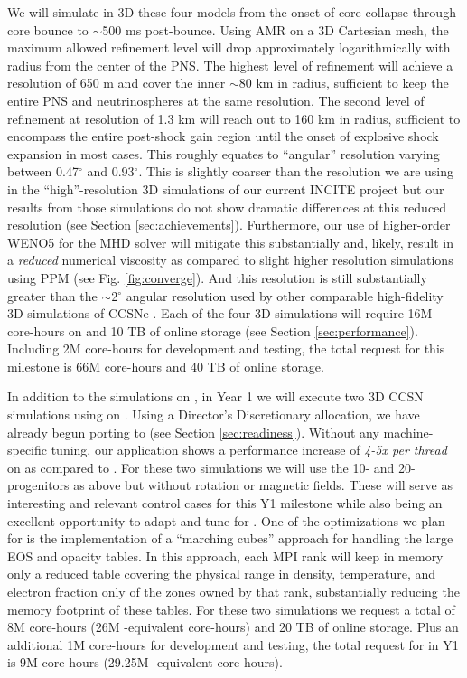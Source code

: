 We will simulate in 3D these four models from the onset of core collapse through core bounce to $\sim$500 ms post-bounce.
Using AMR on a 3D Cartesian mesh, the maximum allowed refinement level will drop approximately logarithmically with radius from the center of the PNS.
The highest level of refinement will achieve a resolution of 650 m and cover the inner $\sim$80 km in radius, sufficient to keep the entire PNS and neutrinospheres at the same resolution.
The second level of refinement at resolution of 1.3 km will reach out to 160 km in radius, sufficient to encompass the entire post-shock gain region until the onset of explosive shock expansion in most cases.
This roughly equates to ``angular'' resolution varying between 0.47$^\circ$ and  0.93$^\circ$.
This is slightly coarser than the resolution we are using in the ``high''-resolution 3D simulations of our current INCITE project but our results from those simulations do not show dramatic differences at this reduced resolution (see Section \ref{sec:achievements}).
Furthermore, our use of higher-order WENO5 for the MHD solver will mitigate this substantially and, likely, result in a {\it reduced} numerical viscosity as compared to slight higher resolution simulations using PPM (see Fig. \ref{fig:converge}).
And this resolution is still substantially greater than the $\sim$2$^\circ$ angular resolution used by other comparable high-fidelity 3D simulations of CCSNe \citep[e.g.,][]{Melson:2015, Lentz:2015, Janka:2016}.
Each of the four 3D simulations will require 16M core-hours on \mira and 10 TB of online storage (see Section \ref{sec:performance}).
Including 2M \mira core-hours for development and testing, the total request for this milestone is 66M \mira core-hours and 40 TB of online storage.

In addition to the simulations on \mira, in Year 1 we will execute two 3D CCSN simulations using \sparkmone on \thet.
Using a Director's Discretionary allocation, we have already begun porting \sparkmone to \thet (see Section \ref{sec:readiness}).
Without any machine-specific tuning, our \sparkmone application shows a performance increase of {\it 4-5x per thread} on \thet as compared to \mira.
For these two simulations we will use the 10- and 20-\msun progenitors as above but without rotation or magnetic fields.
These will serve as interesting and relevant control cases for this Y1 milestone while also being an excellent opportunity to adapt and tune \sparkmone for \thet.
One of the optimizations we plan for \thet is the implementation of a ``marching cubes'' approach for handling the large EOS and opacity tables.
In this approach, each MPI rank will keep in memory only a reduced table covering the physical range in density, temperature, and electron fraction only of the zones owned by that rank, substantially reducing the memory footprint of these tables.
For these two simulations we request a total of 8M \thet core-hours (26M \mira-equivalent core-hours) and 20 TB of online storage.
Plus an additional 1M \thet core-hours for development and testing, the total request for \thet in Y1 is 9M core-hours (29.25M \mira-equivalent core-hours).


